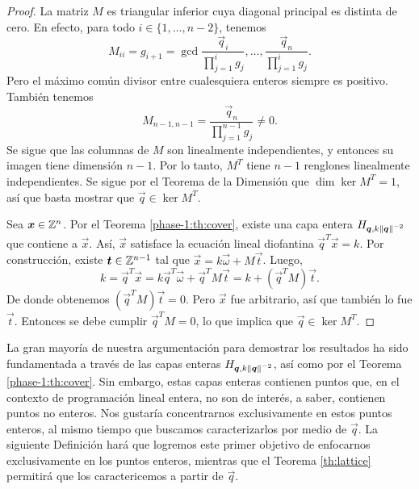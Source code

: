 \begin{proof}
	La matriz $M$ es triangular inferior cuya diagonal principal es distinta de cero. En efecto,
	para todo $i \in \lbrace 1, \ldots, n - 2\rbrace$, tenemos
	\begin{equation*}
		M_{ii} = g_{i + 1} = \gcd{\frac{\vec{q}_i}{\prod_{j=1}^{i}g_j}, \ldots,
		\frac{\vec{q}_n}{\prod_{j=1}^{i}g_j}}.
	\end{equation*}
	Pero el máximo común divisor entre cualesquiera enteros siempre es positivo. También tenemos
	\begin{equation*}
		M_{n-1, n-1} = \frac{\vec{q}_n}{\prod_{j=1}^{n-1}g_j} \neq 0.
	\end{equation*}
	Se sigue que las columnas de $M$ son linealmente
	independientes, y entonces su imagen tiene dimensión $n - 1$. Por lo tanto, $M^T$ tiene $n - 1$
	renglones linealmente independientes. Se sigue por el Teorema de la Dimensión que $\dim
	\ker{M^T} = 1$, así que basta mostrar que $\vec{q} \in \ker{M^T}$.

	Sea $\boldsymbol{x} \in \mathbb{Z}^n$. Por el Teorema \ref{phase-1:th:cover}, existe una capa entera
	$H_{\boldsymbol{q}, k\left\lVert \boldsymbol{q} \right\rVert^{-2}}$ que contiene a $\vec{x}$. Así, $\vec{x}$ satisface la
	ecuación lineal diofantina $\vec{q}^T\vec{x} = k$. Por construcción, existe $\boldsymbol{t} \in
	\mathbb{Z}^{n-1}$ tal que $\vec{x} = k\vec{\omega} + M\vec{t}$. Luego,
	\begin{equation*}
		k = \vec{q}^T\vec{x} = k \vec{q}^T\vec{\omega} + \vec{q}^TM\vec{t} = k +
		(\vec{q}^TM)\vec{t}.
	\end{equation*}
	De donde obtenemos $(\vec{q}^TM)\vec{t} = 0$. Pero $\vec{x}$ fue arbitrario, así que también lo
	fue $\vec{t}$. Entonces se debe cumplir $\vec{q}^TM = 0$, lo que implica que $\vec{q} \in
	\ker{M^T}$.
\end{proof}

La gran mayoría de nuestra argumentación para demostrar los resultados ha sido fundamentada a través
de las capas enteras $H_{\boldsymbol{q}, k\left\lVert \boldsymbol{q} \right\rVert^{-2}}$, así como por el Teorema
\ref{phase-1:th:cover}. Sin embargo, estas capas enteras contienen puntos que, en el contexto de
programación lineal entera, no son de interés, a saber, contienen puntos no enteros. Nos gustaría
concentrarnos exclusivamente en estos puntos enteros, al mismo tiempo que buscamos caracterizarlos
por medio de $\vec{q}$. La siguiente Definición hará que logremos este primer objetivo de enfocarnos
exclusivamente en los puntos enteros, mientras que el Teorema \ref{th:lattice} permitirá que los
caractericemos a partir de $\vec{q}$.

